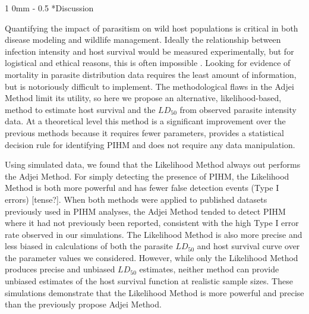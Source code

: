 \documentclass[12pt, a4paper]{article}
\makeatletter
\renewcommand{\section}{\@startsection
{section}%
{1}%
{0mm}%
{-\baselineskip}%
{0.5\baselineskip}%
{\normalfont\bf\large}} %
\makeatother
\begin{document}
\section*{Discussion}


Quantifying the impact of parasitism on wild host populations is critical in
both disease modeling and wildlife management. Ideally the relationship between
infection intensity and host survival would be measured experimentally, but for
logistical and ethical reasons, this is often impossible \citep{McCallum2000a}.
Looking for evidence of mortality in parasite distribution data requires the
least amount of information, but is notoriously difficult to implement. The
methodological flaws in the Adjei Method limit its utility, so here we propose
an alternative, likelihood-based, method to estimate host survival and the
$LD_{50}$ from observed parasite intensity data.  At a theoretical level this
method is a significant improvement over the previous methods because it requires fewer parameters,
provides a statistical decision rule for identifying PIHM and does not require
any data manipulation.

Using simulated data, we found that the Likelihood Method always out performs the Adjei Method. For simply detecting the presence of PIHM, the Likelihood
Method is both more powerful and has fewer false detection events (Type I
errors) [tense?].  When both methods were applied to published datasets previously used
in PIHM analyses, the Adjei Method tended to detect PIHM where it had not previously been
reported, consistent with the high Type I error rate observed in our
simulations. The Likelihood Method is also more precise and less
biased in calculations of both the parasite $LD_{50}$ and host survival curve over the parameter values we considered.
However, while only the Likelihood Method produces precise and unbiased $LD_{50}$
estimates, neither method can provide unbiased estimates of the host survival
function at realistic sample sizes.  These simulations demonstrate that
the Likelihood Method is more powerful and precise than the previously propose Adjei Method.
\end{document}
